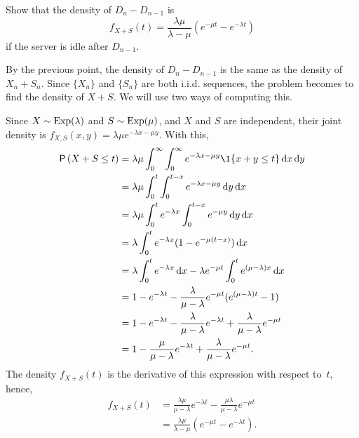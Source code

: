 \begin{extra}
Show that the density of $D_{n} - D_{n-1}$ is
    \begin{equation*}
    f_{X+S}(t) = \frac{\lambda \mu}{\lambda - \mu} (e^{-\mu t} - e^{-\lambda t})
    \end{equation*}
if the server is idle after $D_{n-1}$.
\begin{solution}
      By the previous point, the density of $D_{n} - D_{n-1}$ is the
      same as the density of $X_n + S_n$.  Since $\{X_n\}$ and $\{S_n\}$ are both i.i.d. sequences, the problem becomes to find the density of $X+S$.  We will use two ways of computing this. 

Since $X\sim \operatorname{Exp}(\lambda)$ and $S\sim\operatorname{Exp}(\mu)$, and $X$ and $S$ are independent, their joint density is $f_{X,S}(x,y) = \lambda \mu e^{-\lambda x - \mu y}$. With this,
  \begin{align*}
\P{X+S\leq t } 
&= \lambda \mu \int_0^\infty \int_0^\infty e^{-\lambda x - \mu y} \1{x+y\leq t} \d x \d y \\
&= \lambda \mu \int_0^t \int_0^{t-x} e^{-\lambda x - \mu y} \d y \d x \\
&= \lambda \mu \int_0^t e^{-\lambda x} \int_0^{t-x} e^{- \mu y} \d y \d x \\
&= \lambda \int_0^t e^{-\lambda x} (1-e^{- \mu (t-x)} ) \d x  \\
&= \lambda \int_0^t e^{-\lambda x}  \d x - \lambda e^{-\mu t} \int_0^t e^{(\mu-\lambda) x} \d x \\
&= 1- e^{-\lambda t} - \frac{\lambda}{\mu-\lambda} e^{-\mu t} ( e^{(\mu-\lambda) t} -1) \\
&= 1- e^{-\lambda t} - \frac{\lambda}{\mu-\lambda} e^{-\lambda t} + \frac{\lambda}{\mu-\lambda} e^{-\mu t} \\ 
&= 1 - \frac{\mu}{\mu-\lambda} e^{-\lambda t} + \frac{\lambda}{\mu-\lambda} e^{-\mu t}. \\
  \end{align*}
The density $f_{X+S}(t)$ is the derivative of this expression with respect to~$t$, hence,
\begin{align*}
  f_{X+S}(t) 
&= \frac{\lambda\mu}{\mu-\lambda} e^{-\lambda t}  - \frac{\mu \lambda}{\mu-\lambda} e^{-\mu t} \\
&= \frac{\lambda\mu}{\lambda -\mu}(e^{-\mu t} - e^{-\lambda t}). \\
\end{align*}


\end{solution}
\end{extra}
